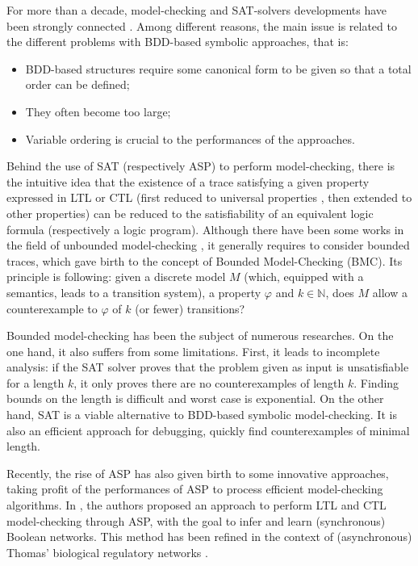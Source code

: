 For more than a decade, model-checking and SAT-solvers developments have been strongly connected \cite{biere1999symbolic}. Among different reasons, the main issue is related to the different problems with BDD-based symbolic approaches, that is:
\begin{itemize}
\item BDD-based structures require some canonical form to be given so that a total order can be defined; 
\item They often become too large;
\item Variable ordering is crucial to the performances of the approaches.  
\end{itemize}

Behind the use of SAT (respectively ASP) to perform model-checking, there is the intuitive idea that the existence of a trace satisfying a given property expressed in LTL \cite{biere1999symbolic} or CTL (first reduced to universal properties \cite{penczek2002bounded}, then extended to other properties) can be reduced to the satisfiability of an equivalent logic formula (respectively a logic program). Although there have been some works in the field of unbounded model-checking \cite{mcmillan2002applying}, it generally requires to consider bounded traces, which gave birth to the concept of Bounded Model-Checking (BMC). Its principle is following: given a discrete model $M$ (which, equipped with a semantics, leads to a transition system), a property $\varphi$ and $k \in \mathbb{N}$, does $M$ allow a counterexample to $\varphi$ of $k$ (or fewer) transitions? 

Bounded model-checking has been the subject of numerous researches. On the one hand, it also suffers from some limitations. First, it leads to incomplete analysis: if the SAT solver proves that the problem given as input is unsatisfiable for a length $k$, it only proves there are no counterexamples of length $k$. Finding bounds on the length is difficult and worst case is exponential. On the other hand, SAT is a viable alternative to BDD-based symbolic model-checking. It is also an efficient approach for debugging, \ie quickly find counterexamples of minimal length. 

Recently, the rise of ASP has also given birth to some innovative approaches, taking profit of the performances of ASP to process efficient model-checking algorithms. In \cite{rocca2013inference}, the authors proposed an approach to perform LTL and CTL model-checking through ASP, with the goal to infer and learn (synchronous) Boolean networks. This method has been refined in the context of (asynchronous) Thomas' biological regulatory networks \cite{roccaasp}. 

